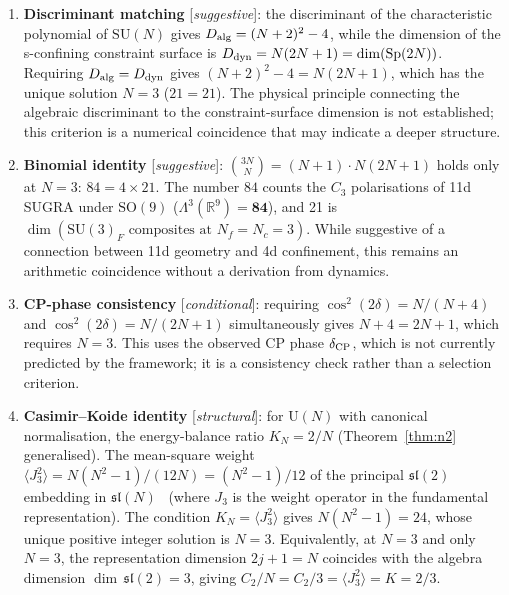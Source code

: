 \documentclass[aps,prd,twocolumn,showpacs,preprintnumbers,superscriptaddress,floatfix]{revtex4-2}
\newcommand{\SU}{\mathrm{SU}}
\newcommand{\UU}{\mathrm{U}}
\newcommand{\SO}{\mathrm{SO}}
\newcommand{\Sp}{\mathrm{Sp}}
\newcommand{\Nf}{N_{\!f}}
\newcommand{\Nc}{N_{\!c}}
\begin{document}
\begin{enumerate}
  \item \textbf{Discriminant matching} [\emph{suggestive}]:
    the discriminant of the characteristic polynomial of $\SU(N)$
    gives $D_{\rm alg} = (N+2)^2 - 4$, while the dimension of
    the s-confining constraint surface is $D_{\rm dyn} = N(2N+1)
    = \dim(\Sp(2N))$.
    Requiring $D_{\rm alg} = D_{\rm dyn}$ gives
    $(N+2)^2 - 4 = N(2N+1)$, which has the unique solution
    $N = 3$ ($21 = 21$).
    The physical principle connecting the algebraic discriminant
    to the constraint-surface dimension is not established; this
    criterion is a numerical coincidence that may indicate a
    deeper structure.

  \item \textbf{Binomial identity} [\emph{suggestive}]:
    $\binom{3N}{N} = (N+1) \cdot N(2N+1)$ holds only at $N = 3$:
    $84 = 4 \times 21$.
    The number $84$ counts the $C_3$ polarisations of 11d SUGRA
    under $\SO(9)$ ($\Lambda^3(\mathbb{R}^9) = \mathbf{84}$),
    and 21 is $\dim(\SU(3)_F \text{ composites at } \Nf = \Nc =
    3)$.
    While suggestive of a connection between 11d geometry and
    4d confinement, this remains an arithmetic coincidence
    without a derivation from dynamics.

  \item \textbf{CP-phase consistency} [\emph{conditional}]:
    requiring $\cos^2(2\delta) = N/(N+4)$ and
    $\cos^2(2\delta) = N/(2N+1)$ simultaneously gives
    $N + 4 = 2N + 1$, which requires $N = 3$.
    This uses the observed CP phase $\delta_{\rm CP}$, which is
    not currently predicted by the framework; it is a
    consistency check rather than a selection criterion.

  \item \textbf{Casimir--Koide identity} [\emph{structural}]:
    for $\UU(N)$ with canonical normalisation, the energy-balance
    ratio $K_N = 2/N$ (Theorem~\ref{thm:n2} generalised).
    The mean-square weight $\langle J_3^2\rangle
    = N(N^2-1)/(12N) = (N^2-1)/12$ of the principal $\mathfrak{sl}(2)$
    embedding in $\mathfrak{sl}(N)$~\cite{Kostant:1959}
    (where $J_3$ is the weight operator in the fundamental
    representation).
    The condition $K_N = \langle J_3^2\rangle$ gives
    $N(N^2-1) = 24$, whose unique positive integer solution is
    $N = 3$.
    Equivalently, at $N = 3$ and only $N = 3$, the representation
    dimension $2j + 1 = N$ coincides with the algebra dimension
    $\dim\,\mathfrak{sl}(2) = 3$, giving
    $C_2/N = C_2/3 = \langle J_3^2\rangle = K = 2/3$.
\end{enumerate}
\end{document}
